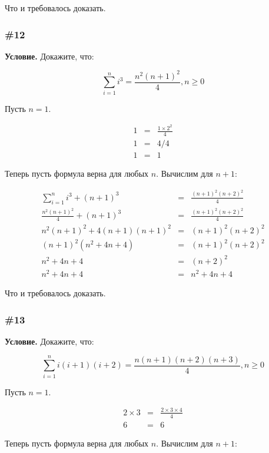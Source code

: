 \documentclass{article}
\begin{document}
Что и требовалось доказать.

\subsubsection{\#12}

\textbf{Условие.}
Докажите, что:

\begin{equation}
    \sum_{i=1}^n i^3 = \frac{n^2(n+1)^2}{4}, n \geqslant 0
\end{equation}

Пусть \(n = 1\).

\begin{eqnarray}
    1 &=& \frac{1 \times 2^2}{4}\\
    1 &=& 4/4\\
    1 &=& 1
\end{eqnarray}

Теперь пусть формула верна для любых \(n\).
Вычислим для \(n+1\):

\begin{eqnarray}
    \sum_{i=1}^n i^3 + (n+1)^3 &=& \frac{(n+1)^2(n+2)^2}{4}\\
    \frac{n^2(n+1)^2}{4} + (n + 1)^3 &=& \frac{(n+1)^2(n+2)^2}{4}\\
    n^2(n+1)^2 + 4(n+1)(n+1)^2 &=& (n+1)^2(n+2)^2\\
    (n+1)^2(n^2 + 4n + 4) &=& (n+1)^2(n+2)^2\\
    n^2 + 4n + 4 &=& (n+2)^2\\
    n^2 + 4n + 4 &=& n^2 + 4n + 4 
\end{eqnarray}

Что и требовалось доказать.

\subsubsection{\#13}

\textbf{Условие.}
Докажите, что:

\begin{equation}
    \sum_{i=1}^n i(i+1)(i+2) = \frac{n(n+1)(n+2)(n+3)}{4}, n \geqslant 0
\end{equation}

Пусть \(n = 1\).

\begin{eqnarray}
    2 \times 3 &=& \frac{2 \times 3 \times 4}{4}\\
    6 &=& 6
\end{eqnarray}

Теперь пусть формула верна для любых \(n\).
Вычислим для \(n+1\):
\end{document}
